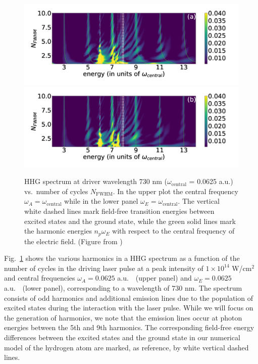 \begin{figure}[!ht]
\centering
    \includegraphics[width=0.8\linewidth]{figs/Frequency_shift/HHG_w_A.png}       
    \includegraphics[width=0.8\linewidth]{figs/Frequency_shift/HHG_w_E.png}
\caption{
HHG spectrum at driver wavelength 730 nm ($\omega_\text{central}$ = 0.0625 a.u.) vs.\ number of cycles $N_\text{FWHM}$. In the upper plot the central frequency $\omega_A = \omega_\text{central}$ while in the lower panel $\omega_E = \omega_\text{central}$. The vertical white dashed lines mark field-free transition energies between excited states and the ground state, while the green solid lines mark the harmonic energies $n_p\omega_E$ with respect to the central frequency of the electric field. (Figure from \cite{venzke2018_Central})
}
  \label{fig:HHG}
\end{figure}

Fig.~\ref{fig:HHG} shows the various harmonics in a HHG spectrum as a function of the number of cycles in the driving laser pulse at a peak intensity of $1\times 10^{14}$ W/cm$^2$ and central frequencies $\omega_A=0.0625$ a.u.\ \ (upper panel) and $\omega_E=0.0625$ a.u.\ \ (lower panel), corresponding to a wavelength of 730 nm. The spectrum consists of odd harmonics and additional emission lines due to the population of excited states during the interaction with the laser pulse. While we will focus on the generation of harmonics, we note that the emission lines occur at photon energies between the 5th and 9th harmonics. The corresponding field-free energy differences between the excited states and the ground state in our numerical model of the hydrogen atom are marked, as reference, by white vertical dashed lines.


